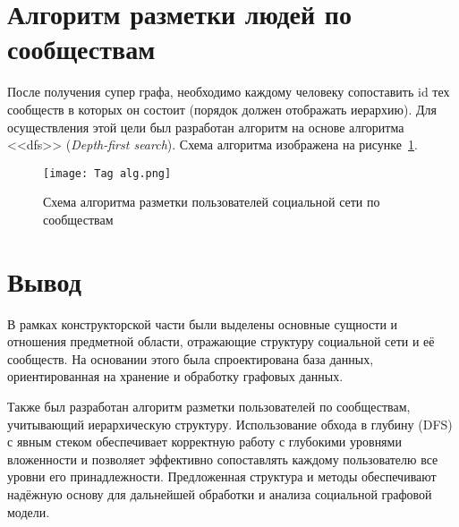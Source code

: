 \section{Алгоритм разметки людей по сообществам}

После получения супер графа, необходимо каждому человеку сопоставить id тех сообществ в которых он состоит (порядок должен отображать иерархию). Для осуществления этой цели был разработан алгоритм на основе алгоритма <<dfs>> (\textit{Depth-first search}). Схема алгоритма изображена на рисунке~\ref{fig:tag alg}.

\begin{figure}[H]
	\centering
	\texttt{[image: Tag alg.png]}
	\caption{Схема алгоритма разметки пользователей социальной сети по сообществам}
	\label{fig:tag alg}
\end{figure}

\section*{Вывод}

В рамках конструкторской части были выделены основные сущности и отношения предметной области, отражающие структуру социальной сети и её сообществ. На основании этого была спроектирована база данных, ориентированная на хранение и обработку графовых данных.

Также был разработан алгоритм разметки пользователей по сообществам, учитывающий иерархическую структуру. Использование обхода в глубину (DFS) с явным стеком обеспечивает корректную работу с глубокими уровнями вложенности и позволяет эффективно сопоставлять каждому пользователю все уровни его принадлежности. Предложенная структура и методы обеспечивают надёжную основу для дальнейшей обработки и анализа социальной графовой модели.
